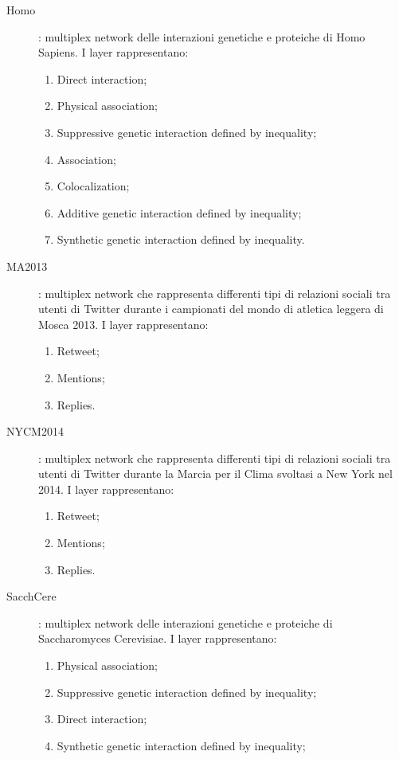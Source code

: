 \begin{description}
    \item[Homo]: multiplex network delle interazioni genetiche e proteiche di 
    Homo Sapiens. I layer rappresentano:
    \begin{enumerate}
        \item Direct interaction;
        \item Physical association;
        \item Suppressive genetic interaction defined by inequality;
        \item Association;
        \item Colocalization;
        \item Additive genetic interaction defined by inequality;
        \item Synthetic genetic interaction defined by inequality.
    \end{enumerate} 
    \item[MA2013]: multiplex network che rappresenta differenti tipi di relazioni sociali 
        tra utenti di Twitter durante i campionati del mondo di atletica leggera 
        di Mosca 2013.
        I layer rappresentano:
        \begin{enumerate}
            \item Retweet;
            \item Mentions;
            \item Replies.
        \end{enumerate}
    \item[NYCM2014]: multiplex network che rappresenta differenti tipi di relazioni sociali 
        tra utenti di Twitter durante la Marcia per il Clima svoltasi a New York nel 2014.
        I layer rappresentano:
        \begin{enumerate}
            \item Retweet;
            \item Mentions;
            \item Replies.
        \end{enumerate}
    \item[SacchCere]: multiplex network delle interazioni genetiche e proteiche di 
        Saccharomyces Cerevisiae. I layer rappresentano:
        \begin{enumerate}
            \item Physical association;
            \item Suppressive genetic interaction defined by inequality;
            \item Direct interaction;
            \item Synthetic genetic interaction defined by inequality;

\end{enumerate}
\end{description}
